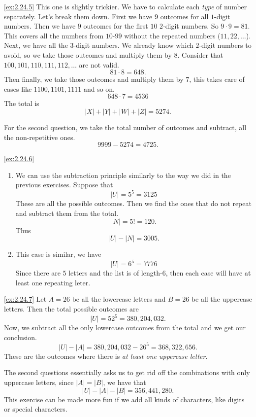 \begin{solution}\label{sol:2.24.5}\ref{ex:2.24.5}
    This one is slightly trickier. We have to calculate each \emph{type} of number separately. Let's break them down. First we have $9$ outcomes for all $1$-digit numbers. Then we have $9$ outcomes for the first $10$ $2$-digit numbers. So $9\cdot 9=81$. This covers all the numbers from $10$-$99$ without the repeated numbers ($11,22,\dots$). Next, we have all the $3$-digit numbers. We already know which $2$-digit numbers to avoid, so we take those outcomes and multiply them by $8$. Consider that $100,101,110,111,112,\dots$ are not valid. 
    $$
    81\cdot 8=648.
    $$
    Then finally, we take those outcomes and multiply them by $7$, this takes care of cases like $1100, 1101,1111$ and so on. 
    $$
    648\cdot 7=4536
    $$
    The total is 
    $$
    \lvert X \rvert+\lvert Y \rvert+\lvert W \rvert+\lvert Z \rvert=5274.
    $$
    
    For the second question, we take the total number of outcomes and subtract, all the non-repetitive ones. 
    $$
    9999-5274=4725.
    $$
\end{solution} 

\begin{solution}\label{sol:2.24.6}\ref{ex:2.24.6}
    \begin{enumerate}
        \item We can use the subtraction principle similarly to the way we did in the previous exercises. Suppose that 
        $$
        \lvert U \rvert=5^{5}=3125
        $$
        These are all the possible outcomes. Then we find the ones that do not repeat and subtract them from the total. 
        $$
        \lvert N \rvert=5!=120.
        $$
        Thus 
        $$
        \lvert U \rvert-\lvert N \rvert=3005.
        $$
        \item This case is similar, we have 
        $$
        \lvert U \rvert=6^{5}=7776
        $$
        Since there are $5$ letters and the list is of length-$6$, then each case will have at least one repeating leter. 
    \end{enumerate}
\end{solution}

\begin{solution}\label{sol:2.24.7}\ref{ex:2.24.7}
    Let $A=26$ be all the lowercase letters and $B=26$ be all the uppercase letters. Then the total possible outcomes are 
    $$
    \lvert U \rvert=52^{5}=380,204,032.
    $$
    Now, we subtract all the only lowercase outcomes from the total and we get our conclusion. 
    $$
    \lvert U \rvert-\lvert A \rvert=380,204,032-26^{5}=368,322,656.
    $$
    These are the outcomes where there is \emph{at least one uppercase letter}. 

    The second questions essentially asks us to get rid off the combinations with only uppercase letters, since $\lvert A \rvert=\lvert B \rvert$, we have that 
    $$
    \lvert U \rvert-\lvert A \rvert-\lvert B \rvert=356,441,280.
    $$
    This exercise can be made more fun if we add all kinds of characters, like digits or special characters. 
\end{solution}

